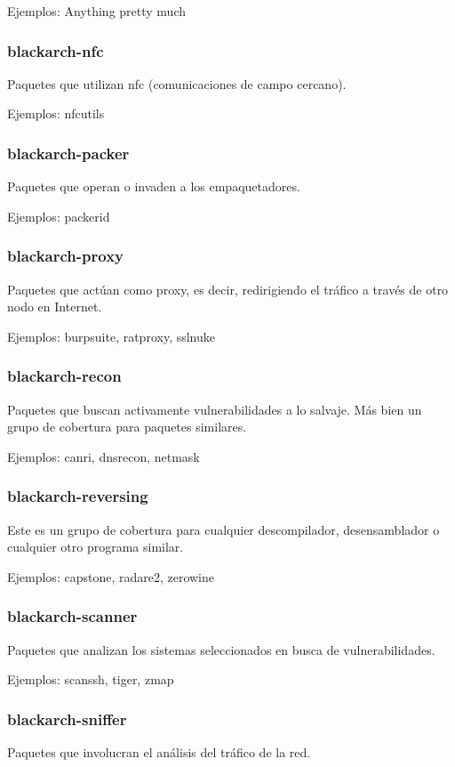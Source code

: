 \documentclass[a4paper, oneside, 11pt]{book}
\begin{document}
Ejemplos: Anything pretty much

\subsubsection{blackarch-nfc}
Paquetes que utilizan nfc (comunicaciones de campo cercano).

Ejemplos: nfcutils

\subsubsection{blackarch-packer}
Paquetes que operan o invaden a los empaquetadores.


Ejemplos: packerid

\subsubsection{blackarch-proxy}
Paquetes que actúan como proxy, es decir, redirigiendo el tráfico
a través de otro nodo en Internet.

Ejemplos: burpsuite, ratproxy, sslnuke

\subsubsection{blackarch-recon}
Paquetes que buscan activamente vulnerabilidades a
lo salvaje. M\'as bien un grupo de cobertura para paquetes similares.

Ejemplos: canri, dnsrecon, netmask

\subsubsection{blackarch-reversing}
Este es un grupo de cobertura para cualquier descompilador,
desensamblador o cualquier otro programa similar.

Ejemplos: capstone, radare2, zerowine

\subsubsection{blackarch-scanner}
Paquetes que analizan los sistemas seleccionados en busca de vulnerabilidades.

Ejemplos: scanssh, tiger, zmap

\subsubsection{blackarch-sniffer}
Paquetes que involucran el análisis del tráfico de la red.
\end{document}
